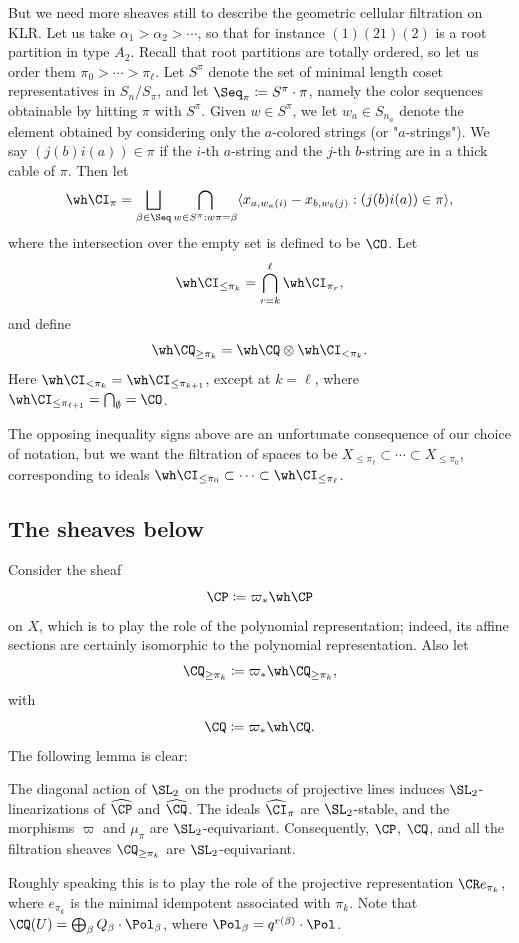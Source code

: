 \documentclass[11pt,reqno]{amsart}
\begin{document}
But we need more sheaves still to describe the geometric cellular filtration on KLR. Let us take $\alpha_1>\alpha_2>\cdots$, so that for instance $(1)(21)(2)$ is a root partition in type $A_2$. Recall that root partitions are totally ordered, so let us order them $\pi_0>\cdots>\pi_\ell$. Let $S^{\pi}$ denote the set of minimal length coset representatives in $S_{n}/S_{\pi}$, and let $\Seq_{\pi}\coloneqq S^{\pi}\cdot\pi$, namely the color sequences obtainable by hitting $\pi$ with $S^{\pi}$. Given $w\in S^{\pi}$, we let $w_a\in S_{n_a}$ denote the element obtained by considering only the $a$-colored strings (or "$a$-strings"). We say $(j(b)i(a))\in\pi$ if the $i$-th $a$-string and the $j$-th $b$-string are in a thick cable of $\pi$. Then let
\[\wh\CI_{\pi} = \bigsqcup_{\beta\in\Seq} \bigcap_{w\in S^{\pi}:w\pi=\beta} \wan{x_{a,w_a(i)}-x_{b,w_b(j)}:(j(b)i(a))\in\pi},\] 
where the intersection over the empty set is defined to be $\CO$. Let
\[\wh\CI_{\le\pi_k}=\bigcap_{r=k}^\ell \wh\CI_{\pi_r},\]
and define
\[\wh\CQ_{\ge\pi_k} = \wh\CQ\otimes \wh\CI_{<\pi_k}.\] Here $\wh\CI_{<\pi_k}=\wh\CI_{\le\pi_{k+1}}$, except at $k=\ell$, where $\wh\CI_{\le\pi_{\ell+1}}=\bigcap_{\emptyset}=\CO$. 
\begin{remark}
    The opposing inequality signs above are an unfortunate consequence of our choice of notation, but we want the filtration of spaces to be $X_{\le\pi_\ell}\subset\cdots\subset X_{\le\pi_0}$, corresponding to ideals $\wh\CI_{\le\pi_0}\subset\cdots\subset\wh\CI_{\le\pi_\ell}$.
\end{remark}







\subsection{The sheaves below}
Consider the sheaf 
\[\CP\coloneqq \varpi_* \wh\CP\] 
on $X$, which is to play the role of the polynomial representation; indeed, its affine sections are certainly isomorphic to the polynomial representation. Also let
\[\CQ_{\ge\pi_k}\coloneqq \varpi_* \wh\CQ_{\ge\pi_k},\]
with 
\[\CQ\coloneqq\varpi_*\wh\CQ.\] The following lemma is clear:\begin{lemma}\label{lem:SL2-equivariance}
The diagonal action of $\SL_2$ on the products of projective lines
induces $\SL_2$-linearizations of $\widehat{\CP}$ and
$\widehat{\CQ}$. The ideals $\widehat{\CI}_\pi$ are
$\SL_2$-stable, and the morphisms $\varpi$ and $\mu_\pi$ are
$\SL_2$-equivariant. Consequently, $\CP$, $\CQ$, and all the
filtration sheaves $\CQ_{\ge\pi_k}$ are $\SL_2$-equivariant.
\end{lemma}
Roughly speaking this is to play the role of the projective representation $\CR e_{\pi_k}$, where $e_{\pi_k}$ is the minimal idempotent associated with $\pi_k$. Note that $\CQ(U)=\bigoplus_\beta Q_\beta\cdot \Pol_\beta$, where $\Pol_\beta= q^{r(\beta)}\cdot\Pol$. 
\end{document}
